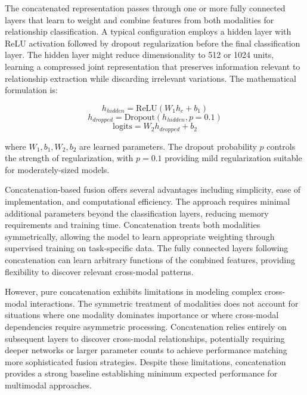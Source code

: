 \documentclass[12pt,a4paper]{report}
\begin{document}
The concatenated representation passes through one or more fully connected layers that learn to weight and combine features from both modalities for relationship classification. A typical configuration employs a hidden layer with ReLU activation followed by dropout regularization before the final classification layer. The hidden layer might reduce dimensionality to 512 or 1024 units, learning a compressed joint representation that preserves information relevant to relationship extraction while discarding irrelevant variations. The mathematical formulation is:

\begin{equation}
h_{hidden} = \text{ReLU}(W_1 h_c + b_1)
\end{equation}
\begin{equation}
h_{dropped} = \text{Dropout}(h_{hidden}, p=0.1)
\end{equation}
\begin{equation}
\text{logits} = W_2 h_{dropped} + b_2
\end{equation}

where $W_1, b_1, W_2, b_2$ are learned parameters. The dropout probability $p$ controls the strength of regularization, with $p=0.1$ providing mild regularization suitable for moderately-sized models.

Concatenation-based fusion offers several advantages including simplicity, ease of implementation, and computational efficiency. The approach requires minimal additional parameters beyond the classification layers, reducing memory requirements and training time. Concatenation treats both modalities symmetrically, allowing the model to learn appropriate weighting through supervised training on task-specific data. The fully connected layers following concatenation can learn arbitrary functions of the combined features, providing flexibility to discover relevant cross-modal patterns.

However, pure concatenation exhibits limitations in modeling complex cross-modal interactions. The symmetric treatment of modalities does not account for situations where one modality dominates importance or where cross-modal dependencies require asymmetric processing. Concatenation relies entirely on subsequent layers to discover cross-modal relationships, potentially requiring deeper networks or larger parameter counts to achieve performance matching more sophisticated fusion strategies. Despite these limitations, concatenation provides a strong baseline establishing minimum expected performance for multimodal approaches.
\end{document}
